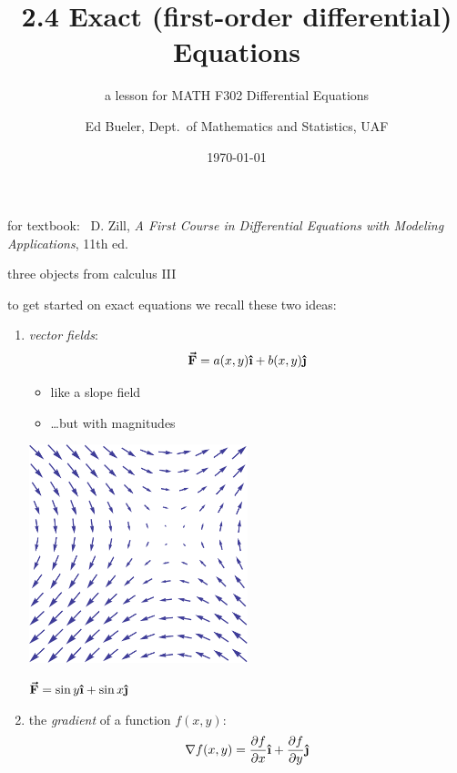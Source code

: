 \documentclass{beamer}
\title{2.4 Exact (first-order differential) Equations}
\subtitle{a lesson for MATH F302 Differential Equations}
\author{Ed Bueler, Dept.~of Mathematics and Statistics, UAF}
\date{\tiny \today}
\newcommand{\grad}{\nabla}
\newcommand{\ih}{\boldsymbol{\hat{\textbf{\i}}}}
\newcommand{\jh}{\boldsymbol{\hat{\textbf{\j}}}}
\newcommand{\vF}{\boldsymbol{\vec{\textbf{F}}}}
\begin{document}

\begin{frame}
\titlepage

\centerline{\tiny for textbook: \, D. Zill, \emph{A First Course in Differential Equations with Modeling Applications}, 11th ed.}
\end{frame}


\begin{frame}{three objects from calculus III}

to get started on exact equations we recall these two ideas:
\begin{enumerate}
\item \begin{minipage}[t]{0.4\textwidth}
\emph{vector fields}:
    $$\vF = a(x,y) \ih + b(x,y) \jh$$

\vspace{-3mm}
    \begin{itemize}
    \small
    \item like a slope field

    \vspace{-2mm}
    \item \dots but with magnitudes
    \end{itemize}
\end{minipage}
\begin{minipage}[t]{0.5\textwidth}
\vspace{-2mm}

\hfill \includegraphics[width=0.5\textwidth]{figs/VectorField}

\hfill \tiny $\boldsymbol{\vec{\textbf{F}}} = \sin y \ih + \sin x \jh$
\end{minipage}

\vspace{-3mm}
\item the \emph{gradient} of a function $f(x,y)$:
    $$\grad f(x,y) = \frac{\partial f}{\partial x} \ih + \frac{\partial f}{\partial y} \jh$$


\end{enumerate}
\end{frame}
\end{document}
